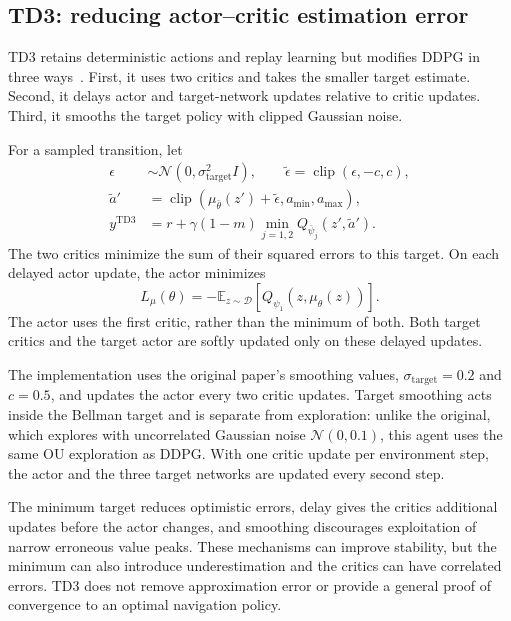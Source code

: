 \documentclass[11pt,a4paper]{article}
\theoremstyle{definition}
\theoremstyle{plain}
\theoremstyle{remark}
\newcommand{\E}{\mathbb{E}}
\begin{document}
\subsection{TD3: reducing actor--critic estimation error}
\label{sec:td3}

TD3 retains deterministic actions and replay learning but modifies DDPG in three ways~\cite{fujimoto2018}. First, it uses two critics and takes the smaller target estimate. Second, it delays actor and target-network updates relative to critic updates. Third, it smooths the target policy with clipped Gaussian noise.

For a sampled transition, let
\begin{align}
 \epsilon&\sim\mathcal N(0,\sigma_{\mathrm{target}}^2 I),\qquad
 \widetilde\epsilon=\operatorname{clip}(\epsilon,-c,c),\\
 \widetilde a'&=\operatorname{clip}
       (\mu_{\bar\theta}(z')+\widetilde\epsilon,a_{\min},a_{\max}),\\
 y^{\mathrm{TD3}}&=r+\gamma(1-m)\min_{j=1,2}Q_{\bar\psi_j}(z',\widetilde a').
 \label{eq:td3-target}
\end{align}
The two critics minimize the sum of their squared errors to this target. On each delayed actor update, the actor minimizes
\begin{equation}
 L_\mu(\theta)=-\E_{z\sim\mathcal D}[Q_{\psi_1}(z,\mu_\theta(z))].
\end{equation}
The actor uses the first critic, rather than the minimum of both. Both target critics and the target actor are softly updated only on these delayed updates.

The implementation uses the original paper's smoothing values, $\sigma_{\mathrm{target}}=0.2$ and $c=0.5$, and updates the actor every two critic updates. Target smoothing acts inside the Bellman target and is separate from exploration: unlike the original, which explores with uncorrelated Gaussian noise $\mathcal N(0,0.1)$, this agent uses the same OU exploration as DDPG. With one critic update per environment step, the actor and the three target networks are updated every second step.

The minimum target reduces optimistic errors, delay gives the critics additional updates before the actor changes, and smoothing discourages exploitation of narrow erroneous value peaks. These mechanisms can improve stability, but the minimum can also introduce underestimation and the critics can have correlated errors. TD3 does not remove approximation error or provide a general proof of convergence to an optimal navigation policy.
\end{document}
